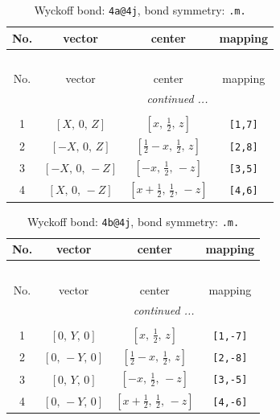 \documentclass[fleqn,8pt]{jsarticle}
\begin{document}
\begin{longtable}{cccc}
\caption{Wyckoff bond: {\tt 4a@4j}, bond symmetry: {\tt .m.}}
 \\
 \hline \hline
No. & vector & center & mapping \\ \hline \endfirsthead

\multicolumn{3}{l}{\tablename\ \thetable{}} \\
 \hline \hline
No. & vector & center & mapping \\ \hline \endhead

 \hline \hline
\multicolumn{3}{r}{\footnotesize\it continued ...} \\ \endfoot

 \hline \hline
\multicolumn{3}{r}{} \\ \endlastfoot

1 & $\left[ X,\, 0,\, Z \right]$ & $\left[ x,\, \frac{1}{2},\, z \right]$ & {\tt [1,7]} \\ \hline
2 & $\left[ - X,\, 0,\, Z \right]$ & $\left[ \frac{1}{2} - x,\, \frac{1}{2},\, z \right]$ & {\tt [2,8]} \\ \hline
3 & $\left[ - X,\, 0,\, - Z \right]$ & $\left[ - x,\, \frac{1}{2},\, - z \right]$ & {\tt [3,5]} \\ \hline
4 & $\left[ X,\, 0,\, - Z \right]$ & $\left[ x + \frac{1}{2},\, \frac{1}{2},\, - z \right]$ & {\tt [4,6]} \\
\end{longtable}
\renewcommand{\arraystretch}{1.2}
\begin{longtable}{cccc}
\caption{Wyckoff bond: {\tt 4b@4j}, bond symmetry: {\tt .m.}}
 \\
 \hline \hline
No. & vector & center & mapping \\ \hline \endfirsthead

\multicolumn{3}{l}{\tablename\ \thetable{}} \\
 \hline \hline
No. & vector & center & mapping \\ \hline \endhead

 \hline \hline
\multicolumn{3}{r}{\footnotesize\it continued ...} \\ \endfoot

 \hline \hline
\multicolumn{3}{r}{} \\ \endlastfoot

1 & $\left[ 0,\, Y,\, 0 \right]$ & $\left[ x,\, \frac{1}{2},\, z \right]$ & {\tt [1,-7]} \\ \hline
2 & $\left[ 0,\, - Y,\, 0 \right]$ & $\left[ \frac{1}{2} - x,\, \frac{1}{2},\, z \right]$ & {\tt [2,-8]} \\ \hline
3 & $\left[ 0,\, Y,\, 0 \right]$ & $\left[ - x,\, \frac{1}{2},\, - z \right]$ & {\tt [3,-5]} \\ \hline
4 & $\left[ 0,\, - Y,\, 0 \right]$ & $\left[ x + \frac{1}{2},\, \frac{1}{2},\, - z \right]$ & {\tt [4,-6]} \\
\end{longtable}
\end{document}
